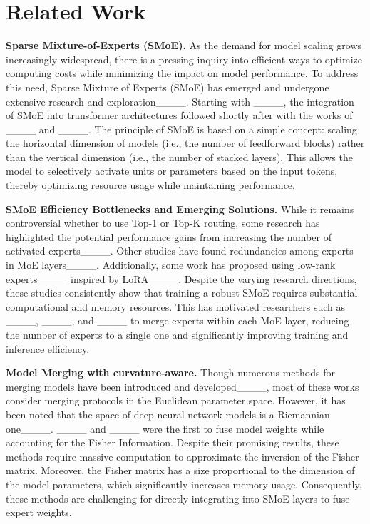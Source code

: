 \section{Related Work}
\textbf{Sparse Mixture-of-Experts (SMoE).} As the demand for model scaling grows increasingly widespread, there is a pressing inquiry into efficient ways to optimize computing costs while minimizing the impact on model performance. To address this need, Sparse Mixture of Experts (SMoE) has emerged and undergone extensive research and exploration____. Starting with ____, the integration of SMoE into transformer architectures followed shortly after with the works of ____ and ____. The principle of SMoE is based on a simple concept: scaling the horizontal dimension of models (i.e., the number of feedforward blocks) rather than the vertical dimension (i.e., the number of stacked layers). This allows the model to selectively activate units or parameters based on the input tokens, thereby optimizing resource usage while maintaining performance.

\textbf{SMoE Efficiency Bottlenecks and Emerging Solutions.} While it remains controversial whether to use Top-1 or Top-K routing, some research has highlighted the potential performance gains from increasing the number of activated experts____. Other studies have found redundancies among experts in MoE layers____. Additionally, some work has proposed using low-rank experts____ inspired by LoRA____. Despite the varying research directions, these studies consistently show that training a robust SMoE requires substantial computational and memory resources. This has motivated researchers such as ____, ____, and ____ to merge experts within each MoE layer, reducing the number of experts to a single one and significantly improving training and inference efficiency.


\textbf{Model Merging with curvature-aware.} Though numerous methods for merging models have been introduced and developed____, most of these works consider merging protocols in the Euclidean parameter space. However, it has been noted that the space of deep neural network models is a Riemannian one____. ____ and ____ were the first to fuse model weights while accounting for the Fisher Information. Despite their promising results, these methods require massive computation to approximate the inversion of the Fisher matrix. Moreover, the Fisher matrix has a size proportional to the dimension of the model parameters, which significantly increases memory usage. Consequently, these methods are challenging for directly integrating into SMoE layers to fuse expert weights.